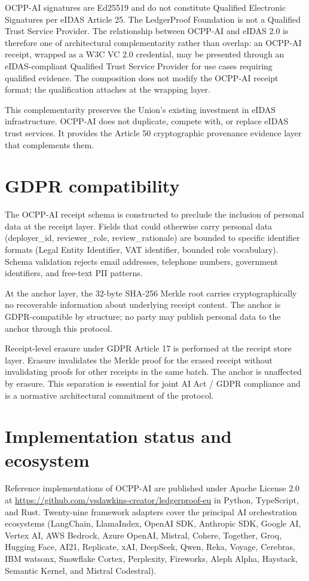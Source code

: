 \documentclass[11pt,a4paper]{article}
\begin{document}
OCPP-AI signatures are Ed25519 and do not constitute Qualified Electronic Signatures per eIDAS Article 25. The LedgerProof Foundation is not a Qualified Trust Service Provider. The relationship between OCPP-AI and eIDAS 2.0 is therefore one of architectural complementarity rather than overlap: an OCPP-AI receipt, wrapped as a W3C VC 2.0 credential, may be presented through an eIDAS-compliant Qualified Trust Service Provider for use cases requiring qualified evidence. The composition does not modify the OCPP-AI receipt format; the qualification attaches at the wrapping layer.

This complementarity preserves the Union's existing investment in eIDAS infrastructure. OCPP-AI does not duplicate, compete with, or replace eIDAS trust services. It provides the Article 50 cryptographic provenance evidence layer that complements them.

\section{GDPR compatibility}

The OCPP-AI receipt schema is constructed to preclude the inclusion of personal data at the receipt layer. Fields that could otherwise carry personal data (deployer\_id, reviewer\_role, review\_rationale) are bounded to specific identifier formats (Legal Entity Identifier, VAT identifier, bounded role vocabulary). Schema validation rejects email addresses, telephone numbers, government identifiers, and free-text PII patterns.

At the anchor layer, the 32-byte SHA-256 Merkle root carries cryptographically no recoverable information about underlying receipt content. The anchor is GDPR-compatible by structure; no party may publish personal data to the anchor through this protocol.

Receipt-level erasure under GDPR Article 17 is performed at the receipt store layer. Erasure invalidates the Merkle proof for the erased receipt without invalidating proofs for other receipts in the same batch. The anchor is unaffected by erasure. This separation is essential for joint AI Act / GDPR compliance and is a normative architectural commitment of the protocol.

\section{Implementation status and ecosystem}

Reference implementations of OCPP-AI are published under Apache License 2.0 at \url{https://github.com/vsdawkins-creator/ledgerproof-eu} in Python, TypeScript, and Rust. Twenty-nine framework adapters cover the principal AI orchestration ecosystems (LangChain, LlamaIndex, OpenAI SDK, Anthropic SDK, Google AI, Vertex AI, AWS Bedrock, Azure OpenAI, Mistral, Cohere, Together, Groq, Hugging Face, AI21, Replicate, xAI, DeepSeek, Qwen, Reka, Voyage, Cerebras, IBM watsonx, Snowflake Cortex, Perplexity, Fireworks, Aleph Alpha, Haystack, Semantic Kernel, and Mistral Codestral).
\end{document}
